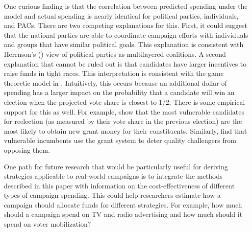 \documentclass[12pt,final,fleqn]{article}
\theoremstyle{plain}
\begin{document}
One curious finding is that the correlation between predicted spending under the model and actual spending is nearly identical for political parties, individuals, and PACs. There are two competing explanations for this. First, it could suggest that the national parties are able to coordinate campaign efforts with individuals and groups that have similar political goals. This explanation is consistent with Herrnson's (\citeyear{herrnson2009roles}) view of political parties as multilayered coalitions. A second explanation that cannot be ruled out is that candidates have larger incentives to raise funds in tight races. This interpretation is consistent with the game theoretic model in \citet{erikson2000equilibria}. Intuitively, this occurs because an additional dollar of spending has a larger impact on the probability that a candidate will win an election when the projected vote share is closest to 1/2. There is some empirical support for this as well. For example, \citet{stein1994congressional} show that the most vulnerable candidates for reelection (as measured by their vote share in the previous election) are the most likely to obtain new grant money for their constituents. Similarly, \citet{bickers1996electoral} find that vulnerable incumbents use the grant system to deter quality challengers from opposing them.

One path for future research that would be particularly useful for deriving strategies applicable to real-world campaigns is to integrate the methods described in this paper with information on the cost-effectiveness of different types of campaign spending. This could help researchers estimate how a campaign should allocate funds for different strategies. For example, how much should a campaign spend on TV and radio advertising and how much should it spend on voter mobilization?


\end{document}
